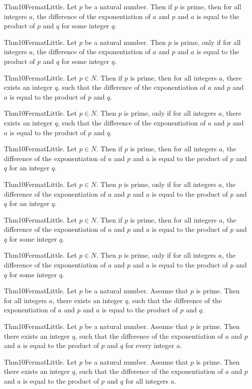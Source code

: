 \documentclass{article}
\begin{document}
Thm10FermatLittle. Let $p$ be a natural number. Then if $p$ is prime, then for all integers $a$, the difference of the exponentiation of $a$ and $p$ and $a$ is equal to the product of $p$ and $q$ for some integer $q$.

Thm10FermatLittle. Let $p$ be a natural number. Then $p$ is prime, only if for all integers $a$, the difference of the exponentiation of $a$ and $p$ and $a$ is equal to the product of $p$ and $q$ for some integer $q$.

Thm10FermatLittle. Let $p \in N$. Then if $p$ is prime, then for all integers $a$, there exists an integer $q$, such that the difference of the exponentiation of $a$ and $p$ and $a$ is equal to the product of $p$ and $q$.

Thm10FermatLittle. Let $p \in N$. Then $p$ is prime, only if for all integers $a$, there exists an integer $q$, such that the difference of the exponentiation of $a$ and $p$ and $a$ is equal to the product of $p$ and $q$.

Thm10FermatLittle. Let $p \in N$. Then if $p$ is prime, then for all integers $a$, the difference of the exponentiation of $a$ and $p$ and $a$ is equal to the product of $p$ and $q$ for an integer $q$.

Thm10FermatLittle. Let $p \in N$. Then $p$ is prime, only if for all integers $a$, the difference of the exponentiation of $a$ and $p$ and $a$ is equal to the product of $p$ and $q$ for an integer $q$.

Thm10FermatLittle. Let $p \in N$. Then if $p$ is prime, then for all integers $a$, the difference of the exponentiation of $a$ and $p$ and $a$ is equal to the product of $p$ and $q$ for some integer $q$.

Thm10FermatLittle. Let $p \in N$. Then $p$ is prime, only if for all integers $a$, the difference of the exponentiation of $a$ and $p$ and $a$ is equal to the product of $p$ and $q$ for some integer $q$.

Thm10FermatLittle. Let $p$ be a natural number. Assume that $p$ is prime. Then for all integers $a$, there exists an integer $q$, such that the difference of the exponentiation of $a$ and $p$ and $a$ is equal to the product of $p$ and $q$.

Thm10FermatLittle. Let $p$ be a natural number. Assume that $p$ is prime. Then there exists an integer $q$, such that the difference of the exponentiation of $a$ and $p$ and $a$ is equal to the product of $p$ and $q$ for every integer $a$.

Thm10FermatLittle. Let $p$ be a natural number. Assume that $p$ is prime. Then there exists an integer $q$, such that the difference of the exponentiation of $a$ and $p$ and $a$ is equal to the product of $p$ and $q$ for all integers $a$.
\end{document}
